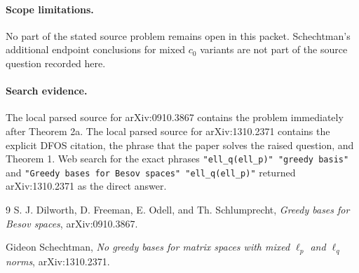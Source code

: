 \documentclass[11pt]{article}
\begin{document}
\paragraph{Scope limitations.}
No part of the stated source problem remains open in this packet.  Schechtman's
additional endpoint conclusions for mixed $c_0$ variants are not part of the
source question recorded here.

\paragraph{Search evidence.}
The local parsed source for arXiv:0910.3867 contains the problem immediately
after Theorem 2a.  The local parsed source for arXiv:1310.2371 contains the
explicit DFOS citation, the phrase that the paper solves the raised question,
and Theorem 1.  Web search for the exact phrases
\texttt{"ell\_q(ell\_p)" "greedy basis"} and
\texttt{"Greedy bases for Besov spaces" "ell\_q(ell\_p)"} returned
arXiv:1310.2371 as the direct answer.

\begin{thebibliography}{9}
S. J. Dilworth, D. Freeman, E. Odell, and Th. Schlumprecht,
\emph{Greedy bases for Besov spaces},
arXiv:0910.3867.

Gideon Schechtman,
\emph{No greedy bases for matrix spaces with mixed $\ell_p$ and $\ell_q$ norms},
arXiv:1310.2371.
\end{thebibliography}
\end{document}
